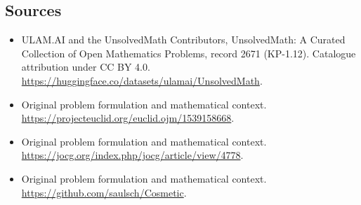 \documentclass[11pt]{article}
\begin{document}
\subsection{Sources}
\begin{itemize}
\item[\hypertarget{source:2671:1}{S1}] ULAM.AI and the UnsolvedMath Contributors, UnsolvedMath: A Curated Collection of Open Mathematics Problems, record 2671 (KP-1.12). Catalogue attribution under CC BY 4.0.
\url{https://huggingface.co/datasets/ulamai/UnsolvedMath}.
\item[\hypertarget{source:2671:2}{S2}] Original problem formulation and mathematical context.
\url{https://projecteuclid.org/euclid.ojm/1539158668}.
\item[\hypertarget{source:2671:3}{S3}] Original problem formulation and mathematical context.
\url{https://jocg.org/index.php/jocg/article/view/4778}.
\item[\hypertarget{source:2671:4}{S4}] Original problem formulation and mathematical context.
\url{https://github.com/saulsch/Cosmetic}.
\end{itemize}
\label{end:2671}
\end{document}
